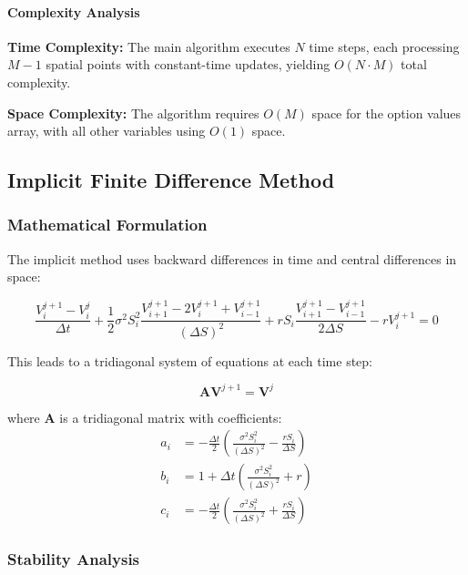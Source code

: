 \documentclass[12pt,a4paper]{article}
\numberwithin{algorithm}{subsection}
\begin{document}
\paragraph{Complexity Analysis}

\textbf{Time Complexity:} The main algorithm executes $N$ time steps, each processing $M-1$ spatial points with constant-time updates, yielding $O(N \cdot M)$ total complexity.

\textbf{Space Complexity:} The algorithm requires $O(M)$ space for the option values array, with all other variables using $O(1)$ space.

\subsection{Implicit Finite Difference Method}

\subsubsection{Mathematical Formulation}

The implicit method uses backward differences in time and central differences in space:

\begin{equation}
\frac{V_i^{j+1} - V_i^j}{\Delta t} + \frac{1}{2}\sigma^2 S_i^2 \frac{V_{i+1}^{j+1} - 2V_i^{j+1} + V_{i-1}^{j+1}}{(\Delta S)^2} + rS_i \frac{V_{i+1}^{j+1} - V_{i-1}^{j+1}}{2\Delta S} - rV_i^{j+1} = 0
\end{equation}

This leads to a tridiagonal system of equations at each time step:

\begin{equation}
\mathbf{A} \mathbf{V}^{j+1} = \mathbf{V}^j
\end{equation}

where $\mathbf{A}$ is a tridiagonal matrix with coefficients:
\begin{align}
a_i &= -\frac{\Delta t}{2} \left( \frac{\sigma^2 S_i^2}{(\Delta S)^2} - \frac{rS_i}{\Delta S} \right) \\
b_i &= 1 + \Delta t \left( \frac{\sigma^2 S_i^2}{(\Delta S)^2} + r \right) \\
c_i &= -\frac{\Delta t}{2} \left( \frac{\sigma^2 S_i^2}{(\Delta S)^2} + \frac{rS_i}{\Delta S} \right)
\end{align}

\subsubsection{Stability Analysis}
\end{document}
